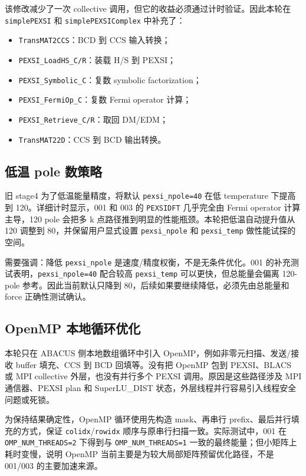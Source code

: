 \documentclass[a4paper,11pt]{article}
\newcommand{\code}[1]{\texttt{#1}}
\begin{document}
该修改减少了一次 collective 调用，但它的收益必须通过计时验证。因此本轮在 \code{simplePEXSI} 和 \code{simplePEXSIComplex} 中补充了：

\begin{itemize}
    \item \code{TransMAT2CCS}：BCD 到 CCS 输入转换；
    \item \code{PEXSI\_LoadHS\_C/R}：装载 H/S 到 PEXSI；
    \item \code{PEXSI\_Symbolic\_C}：复数 symbolic factorization；
    \item \code{PEXSI\_FermiOp\_C}：复数 Fermi operator 计算；
    \item \code{PEXSI\_Retrieve\_C/R}：取回 DM/EDM；
    \item \code{TransMAT22D}：CCS 到 BCD 输出转换。
\end{itemize}

\subsection{低温 pole 数策略}

旧 stage4 为了低温能量精度，将默认 \code{pexsi\_npole=40} 在低 temperature 下提高到 120。详细计时显示，001 和 003 的 \code{PEXSIDFT} 几乎完全由 Fermi operator 计算主导，120 pole 会把多 k 点路径推到明显的性能瓶颈。本轮把低温自动提升值从 120 调整到 80，并保留用户显式设置 \code{pexsi\_npole} 和 \code{pexsi\_temp} 做性能试探的空间。

需要强调：降低 \code{pexsi\_npole} 是速度/精度权衡，不是无条件优化。001 的补充测试表明，\code{pexsi\_npole=40} 配合较高 \code{pexsi\_temp} 可以更快，但总能量会偏离 120-pole 参考。因此当前默认只降到 80，后续如果要继续降低，必须先由总能量和 force 正确性测试确认。

\subsection{OpenMP 本地循环优化}

本轮只在 ABACUS 侧本地数组循环中引入 OpenMP，例如非零元扫描、发送/接收 buffer 填充、CCS 到 BCD 回填等。没有把 OpenMP 包到 PEXSI、BLACS 或 MPI collective 外层，也没有并行多个 PEXSI 调用。原因是这些路径涉及 MPI 通信器、PEXSI plan 和 SuperLU\_DIST 状态，外层线程并行容易引入线程安全问题或死锁。

为保持结果确定性，OpenMP 循环使用先构造 mask、再串行 prefix、最后并行填充的方式，保证 \code{colidx}/\code{rowidx} 顺序与原串行扫描一致。实际测试中，001 在 \code{OMP\_NUM\_THREADS=2} 下得到与 \code{OMP\_NUM\_THREADS=1} 一致的最终能量；但小矩阵上耗时变慢，说明 OpenMP 当前主要是为较大局部矩阵预留优化路径，不是 001/003 的主要加速来源。
\end{document}
